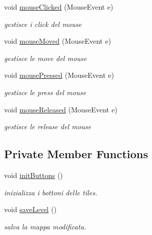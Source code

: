 \begin{DoxyCompactItemize}
void \hyperlink{classui_1_1_tool_bar_a45d56bd84238e8b56589dfc732e2b2cf}{mouse\+Clicked} (Mouse\+Event e)
\begin{DoxyCompactList}\small\item\em gestisce i click del mouse \end{DoxyCompactList}\item 
void \hyperlink{classui_1_1_tool_bar_a2ca251710b65639ec80bc141edde60aa}{mouse\+Moved} (Mouse\+Event e)
\begin{DoxyCompactList}\small\item\em gestisce le move del mouse \end{DoxyCompactList}\item 
void \hyperlink{classui_1_1_tool_bar_aed82e1ce3dd3cf283d508c3ba3be70ef}{mouse\+Pressed} (Mouse\+Event e)
\begin{DoxyCompactList}\small\item\em gestisce le press del mouse \end{DoxyCompactList}\item 
void \hyperlink{classui_1_1_tool_bar_a87a07291794e15052db67f945d90853e}{mouse\+Released} (Mouse\+Event e)
\begin{DoxyCompactList}\small\item\em gestisce le release del mouse \end{DoxyCompactList}\end{DoxyCompactItemize}
\subsection*{Private Member Functions}
\begin{DoxyCompactItemize}
\item 
void \hyperlink{classui_1_1_tool_bar_a27d3ba5afb772cc36c9a432c28975ace}{init\+Buttons} ()
\begin{DoxyCompactList}\small\item\em inizializza i bottoni delle tiles. \end{DoxyCompactList}\item 
void \hyperlink{classui_1_1_tool_bar_af1c1bf274cd89c18726a992a073a7c6d}{save\+Level} ()
\begin{DoxyCompactList}\small\item\em salva la mappa modificata. \end{DoxyCompactList}\end{DoxyCompactItemize}

